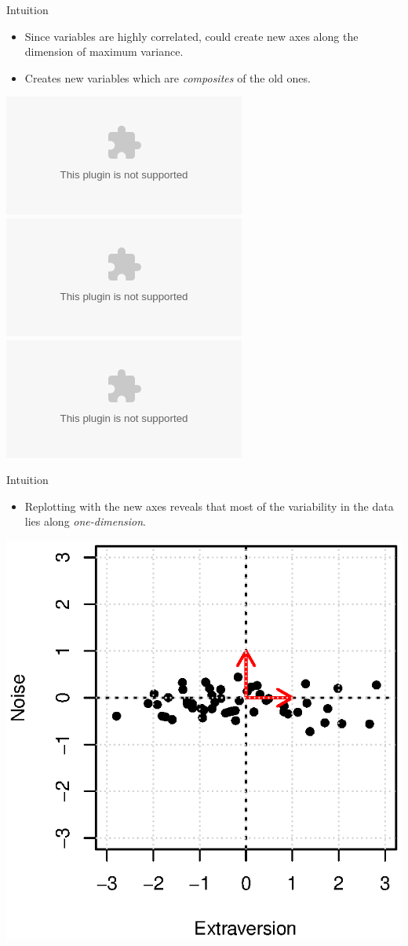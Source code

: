 \begin{frame}{Intuition}
	\begin{minipage}{0.47\textwidth}
    		\begin{itemize}
        		\item Since variables are highly correlated, could create new axes along the 
					 dimension of maximum variance.
			\item Creates new variables which are \emph{composites} of the old ones.
    		\end{itemize}
	\end{minipage}
	\begin{minipage}{0.5\textwidth}
    		\begin{center}
        		\includegraphics<1>[scale=.6, left]{figures/pca1.eps}
			\includegraphics<2>[scale=.6, left]{figures/pca4.eps}
			\includegraphics<3>[scale=.6, left]{figures/pca5.eps}
    		\end{center}
	\end{minipage}
\end{frame}

\begin{frame}{Intuition}
	\begin{minipage}{0.47\textwidth}
    		\begin{itemize}
        		\item Replotting with the new axes reveals that most of the variability in the data 
				  lies along \emph{one-dimension}.
    		\end{itemize}
	\end{minipage}
	\begin{minipage}{0.5\textwidth}
    		\begin{center}
        		\includegraphics[scale=.6, left]{figures/pca6.eps}
    		\end{center}
	\end{minipage}
\end{frame}